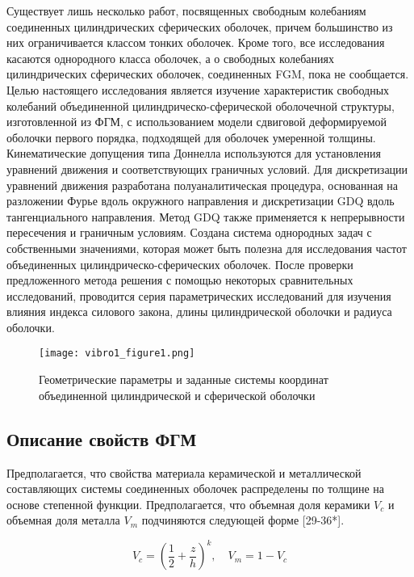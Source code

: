 Существует лишь несколько работ, посвященных свободным колебаниям соединенных цилиндрических сферических оболочек, причем большинство из них ограничивается классом тонких оболочек. Кроме того, все исследования касаются однородного класса оболочек, а о свободных колебаниях цилиндрических сферических оболочек, соединенных FGM, пока не сообщается. Целью настоящего исследования является изучение характеристик свободных колебаний объединенной цилиндрическо-сферической оболочечной структуры, изготовленной из ФГМ, с использованием модели сдвиговой деформируемой оболочки первого порядка, подходящей для оболочек умеренной толщины. Кинематические допущения типа Доннелла используются для установления уравнений движения и соответствующих граничных условий. Для дискретизации уравнений движения разработана полуаналитическая процедура, основанная на разложении Фурье вдоль окружного направления и дискретизации GDQ вдоль тангенциального направления. Метод GDQ также применяется к непрерывности пересечения и граничным условиям. Создана система однородных задач с собственными значениями, которая может быть полезна для исследования частот объединенных цилиндрическо-сферических оболочек. После проверки предложенного метода решения с помощью некоторых сравнительных исследований, проводится серия параметрических исследований для изучения влияния индекса силового закона, длины цилиндрической оболочки и радиуса оболочки.

\begin{figure}[h!]
	\centering
	\texttt{[image: vibro1\_figure1.png]}%
	\caption{Геометрические параметры и заданные системы координат объединенной цилиндрической и сферической оболочки}
	\label{fig:vibro1:1}
\end{figure}

\subsection{Описание свойств ФГМ} \label{ch:ch3/sec2/sub2}
Предполагается, что свойства материала керамической и металлической составляющих системы соединенных оболочек распределены по толщине на основе степенной функции. Предполагается, что объемная доля керамики \(V_c\) и объемная доля металла \(V_m\) подчиняются следующей форме [29-36*].

\begin{equation}
	\label{eq:vibro1:1}
	V_c = \left (\frac{1}{2}+\frac{z}{h} \right )^{k} ,\quad  V_m =1 - V_c
\end{equation}


